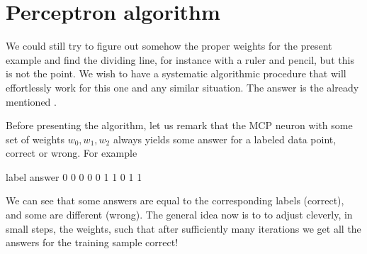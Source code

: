 \documentclass[letterpaper,10pt,english]{jupyterBook}
\begin{document}
\section{Perceptron algorithm}
\label{\detokenize{docs/perceptron:perceptron-algorithm}}
\sphinxAtStartPar
We could still try to figure out somehow the proper weights for the present example and find the dividing line, for instance with a ruler and pencil, but this is not the point. We wish to have a systematic algorithmic procedure that will effortlessly work for this one and any similar situation. The answer is the already mentioned .

\sphinxAtStartPar
Before presenting the algorithm, let us remark that the MCP neuron with some set of weights \(w_0, w_1, w_2\) always yields some answer for a labeled data point, correct or wrong. For example

\begin{sphinxVerbatim}[commandchars=\\\{\}]
\PYG{p}{[}\PYG{p}{]}           

 

    
    \PYG{p}{[}\PYG{p}{]}\PYG{p}{[}\PYG{p}{]} 
\end{sphinxVerbatim}

\begin{sphinxVerbatim}[commandchars=\\\{\}]
label  answer
0      0
0      0
0      1
1      0
1      1
\end{sphinxVerbatim}

\sphinxAtStartPar
We can see that some answers are equal to the corresponding labels (correct), and some are different (wrong). The general idea now is to  to adjust cleverly, in small steps, the weights, such that after sufficiently many iterations we get all the answers for the training sample correct!
\end{document}
